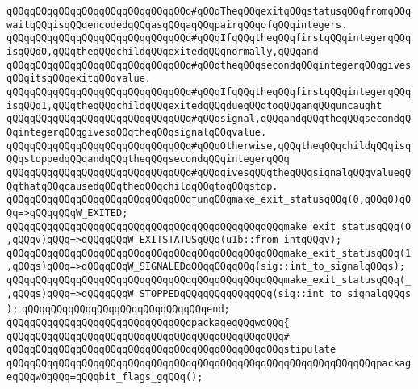 \newline
\verb|qQQqqQQqqQQqqQQqqQQqqQQqqQQqqQQq#qQQqTheqQQqexitqQQqstatusqQQqfromqQQqwaitqQQqisqQQqencodedqQQqasqQQqaqQQqpairqQQqofqQQqintegers.|\newline
\verb|qQQqqQQqqQQqqQQqqQQqqQQqqQQqqQQq#qQQqIfqQQqtheqQQqfirstqQQqintegerqQQqisqQQq0,qQQqtheqQQqchildqQQqexitedqQQqnormally,qQQqand|\newline
\verb|qQQqqQQqqQQqqQQqqQQqqQQqqQQqqQQq#qQQqtheqQQqsecondqQQqintegerqQQqgivesqQQqitsqQQqexitqQQqvalue.|\newline
\verb|qQQqqQQqqQQqqQQqqQQqqQQqqQQqqQQq#qQQqIfqQQqtheqQQqfirstqQQqintegerqQQqisqQQq1,qQQqtheqQQqchildqQQqexitedqQQqdueqQQqtoqQQqanqQQquncaught|\newline
\verb|qQQqqQQqqQQqqQQqqQQqqQQqqQQqqQQq#qQQqsignal,qQQqandqQQqtheqQQqsecondqQQqintegerqQQqgivesqQQqtheqQQqsignalqQQqvalue.|\newline
\verb|qQQqqQQqqQQqqQQqqQQqqQQqqQQqqQQq#qQQqOtherwise,qQQqtheqQQqchildqQQqisqQQqstoppedqQQqandqQQqtheqQQqsecondqQQqintegerqQQq|\newline
\verb|qQQqqQQqqQQqqQQqqQQqqQQqqQQqqQQq#qQQqgivesqQQqtheqQQqsignalqQQqvalueqQQqthatqQQqcausedqQQqtheqQQqchildqQQqtoqQQqstop.|\newline
\newline
\verb|qQQqqQQqqQQqqQQqqQQqqQQqqQQqqQQqfunqQQqmake_exit_statusqQQq(0,qQQq0)qQQq=>qQQqqQQqW_EXITED;|\newline
\verb|qQQqqQQqqQQqqQQqqQQqqQQqqQQqqQQqqQQqqQQqqQQqqQQqmake_exit_statusqQQq(0,qQQqv)qQQq=>qQQqqQQqW_EXITSTATUSqQQq(u1b::from_intqQQqv);|\newline
\verb|qQQqqQQqqQQqqQQqqQQqqQQqqQQqqQQqqQQqqQQqqQQqqQQqmake_exit_statusqQQq(1,qQQqs)qQQq=>qQQqqQQqW_SIGNALEDqQQqqQQqqQQq(sig::int_to_signalqQQqs);|\newline
\verb|qQQqqQQqqQQqqQQqqQQqqQQqqQQqqQQqqQQqqQQqqQQqqQQqmake_exit_statusqQQq(_,qQQqs)qQQq=>qQQqqQQqW_STOPPEDqQQqqQQqqQQqqQQq(sig::int_to_signalqQQqs);|\newline
\verb|qQQqqQQqqQQqqQQqqQQqqQQqqQQqqQQqend;|\newline
\newline
\verb|qQQqqQQqqQQqqQQqqQQqqQQqqQQqqQQqpackageqQQqwqQQq{|\newline
\verb|qQQqqQQqqQQqqQQqqQQqqQQqqQQqqQQqqQQqqQQqqQQqqQQq#|\newline
\verb|qQQqqQQqqQQqqQQqqQQqqQQqqQQqqQQqqQQqqQQqqQQqqQQqstipulate|\newline
\verb|qQQqqQQqqQQqqQQqqQQqqQQqqQQqqQQqqQQqqQQqqQQqqQQqqQQqqQQqqQQqqQQqpackageqQQqw0qQQq=qQQqbit_flags_gqQQq();|\newline
